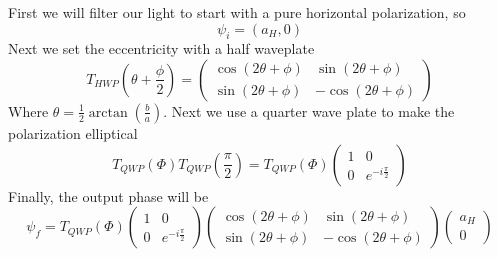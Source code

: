 First we will filter our light to start with a pure horizontal polarization, so
$$
\psi_i = (a_H, 0)
$$
Next we set the eccentricity with a half waveplate
$$
T_{HWP}(\theta + \frac{\phi}{2}) = \begin{pmatrix}
    \cos (2\theta + \phi) & \sin (2\theta + \phi)\\
    \sin (2\theta + \phi) & -\cos (2\theta + \phi)
\end{pmatrix}
$$
Where $\theta = \frac{1}{2}\arctan(\frac{b}{a})$. Next we use a quarter wave plate to make the polarization elliptical
$$
T_{QWP}(\Phi)T_{QWP}(\frac{\pi}{2}) = T_{QWP}(\Phi)\begin{pmatrix}
    1 & 0\\
    0 & e^{-i\frac{\pi}{2}}
\end{pmatrix}
$$
Finally, the output phase will be
$$
\psi_f = T_{QWP}(\Phi)\begin{pmatrix}
    1 & 0\\
    0 & e^{-i\frac{\pi}{2}}
\end{pmatrix}\begin{pmatrix}
    \cos (2\theta + \phi) & \sin (2\theta + \phi)\\
    \sin (2\theta + \phi) & -\cos (2\theta + \phi)
\end{pmatrix} \begin{pmatrix}
    a_H \\ 0
\end{pmatrix}
$$